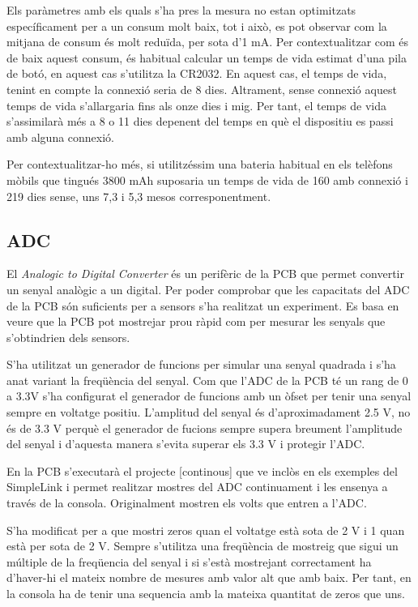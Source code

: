 Els paràmetres amb els quals s'ha pres la mesura no estan optimitzats específicament per a un consum molt baix, tot i això, es pot observar com la mitjana de consum és molt reduïda, per sota d'1 mA.
Per contextualitzar com és de baix aquest consum, és habitual calcular un temps de vida estimat d'una pila de botó, en aquest cas s'utilitza la CR2032.
En aquest cas, el temps de vida, tenint en compte la connexió seria de 8 dies.
Altrament, sense connexió aquest temps de vida s'allargaria fins als onze dies i mig.
Per tant, el temps de vida s'assimilarà més a 8 o 11 dies depenent del temps en què el dispositiu es passi amb alguna connexió.

Per contextualitzar-ho més, si utilitzéssim una bateria habitual en els telèfons mòbils que tingués 3800 mAh suposaria un temps de vida de 160 amb connexió i 219 dies sense, uns 7,3 i 5,3 mesos corresponentment.


\subsection{ADC}
El \textit{Analogic to Digital Converter} és un perifèric de la PCB que permet convertir un senyal analògic a un digital.
Per poder comprobar que les capacitats del ADC de la PCB són suficients per a sensors s'ha realitzat un experiment.
Es basa en veure que la PCB pot mostrejar prou ràpid com per mesurar les senyals que s'obtindrien dels sensors.

S'ha utilitzat un generador de funcions per simular una senyal quadrada i s'ha anat variant la freqüència del senyal.
Com que l'ADC de la PCB té un rang de 0 a 3.3V s'ha configurat el generador de funcions amb un òfset per tenir una senyal sempre en voltatge positiu.
L'amplitud del senyal és d'aproximadament 2.5 V, no és de 3.3 V perquè el generador de fucions sempre supera breument l'amplitude del senyal i d'aquesta manera s'evita superar els 3.3 V i protegir l'ADC.

En la PCB s'executarà el projecte [continous] que ve inclòs en els exemples del SimpleLink i permet realitzar mostres del ADC continuament i les ensenya a través de la consola.
Originalment mostren els volts que entren a l'ADC.

S'ha modificat per a que mostri zeros quan el voltatge està sota de 2 V i 1 quan està per sota de 2 V.
Sempre s'utilitza una freqüència de mostreig que sigui un múltiple de la freqüencia del senyal i si s'està mostrejant correctament ha d'haver-hi el mateix nombre de mesures amb valor alt que amb baix.
Per tant, en la consola ha de tenir una sequencia amb la mateixa quantitat de zeros que uns.

